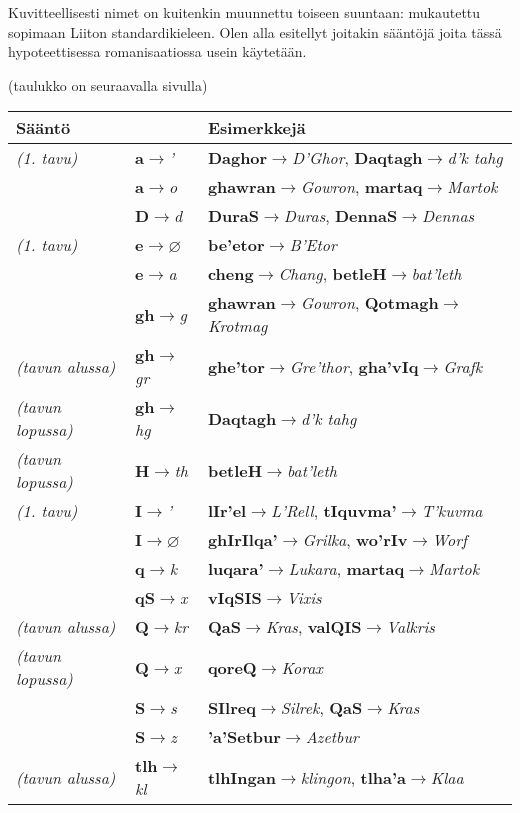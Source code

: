 \documentclass{book}
\begin{document}
Kuvitteellisesti nimet on kuitenkin muunnettu toiseen suuntaan: mukautettu sopimaan Liiton standardikieleen. Olen alla esitellyt joitakin sääntöjä joita tässä hypoteettisessa romanisaatiossa usein käytetään.

(taulukko on seuraavalla sivulla)

\newcommand{\strule}[2]{\textbf{#1}$\to$\textit{#2}}

\begin{tabular}{l l l}
    Sääntö & & Esimerkkejä \\
    \hline
    \textit{(1. tavu)} & \strule{a}{'} & \strule{Daghor}{D'Ghor}, \strule{Daqtagh}{d'k tahg} \\
    & \strule{a}{o} & \strule{ghawran}{Gowron}, \strule{martaq}{Martok} \\
    & \strule{D}{d} & \strule{DuraS}{Duras}, \strule{DennaS}{Dennas} \\
    \textit{(1. tavu)} & \strule{e}{$\varnothing$} & \strule{be'etor}{B'Etor} \\
    & \strule{e}{a} & \strule{cheng}{Chang}, \strule{betleH}{bat'leth} \\
    & \strule{gh}{g} & \strule{ghawran}{Gowron}, \strule{Qotmagh}{Krotmag} \\
    \textit{(tavun alussa)} & \strule{gh}{gr} & \strule{ghe'tor}{Gre'thor}, \strule{gha'vIq}{Grafk} \\
    \textit{(tavun lopussa)} & \strule{gh}{hg} & \strule{Daqtagh}{d'k tahg} \\
    \textit{(tavun lopussa)} & \strule{H}{th} & \strule{betleH}{bat'leth} \\
    \textit{(1. tavu)} & \strule{I}{'} & \strule{lIr'el}{L'Rell}, \strule{tIquvma'}{T'kuvma} \\
    & \strule{I}{$\varnothing$} & \strule{ghIrIlqa'}{Grilka}, \strule{wo'rIv}{Worf} \\
    & \strule{q}{k} & \strule{luqara'}{Lukara}, \strule{martaq}{Martok} \\
    & \strule{qS}{x} & \strule{vIqSIS}{Vixis} \\
    \textit{(tavun alussa)} & \strule{Q}{kr} & \strule{QaS}{Kras}, \strule{valQIS}{Valkris} \\
    \textit{(tavun lopussa)} & \strule{Q}{x} & \strule{qoreQ}{Korax} \\
    & \strule{S}{s} & \strule{SIlreq}{Silrek}, \strule{QaS}{Kras} \\
    & \strule{S}{z} & \strule{'a'Setbur}{Azetbur} \\
    \textit{(tavun alussa)} & \strule{tlh}{kl} & \strule{tlhIngan}{klingon}, \strule{tlha'a}{Klaa} \\

\end{tabular}
\end{document}
